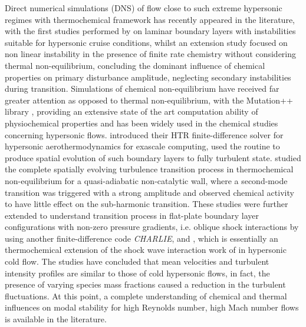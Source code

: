 
Direct numerical simulations (DNS) of flow close to such extreme hypersonic regimes with thermochemical framework has recently appeared in the literature, with the first studies performed by \cite{marxen2013} on laminar boundary layers with instabilities suitable for hypersonic cruise conditions, whilst an extension study \citep{marxen_iaccarino_magin_2014} focused on non linear instability in the presence of finite rate chemistry without considering thermal non-equilibrium, concluding the dominant influence of chemical properties on primary disturbance amplitude, neglecting secondary instabilities during transition. Simulations of chemical non-equilibrium have received far greater attention as opposed to thermal non-equilibrium, with the Mutation++ library \cite{Scoggins2020}, providing an extensive state of the art computation ability of physiochemical properties and has been widely used in the chemical studies concerning hypersonic flows. \cite{DiRenzo2020} introduced their HTR finite-difference solver for hypersonic aerothermodynamics for exascale computing, \cite{direnzo_urzay_2021} used the routine to produce spatial evolution of such boundary layers to fully turbulent state. \cite{Passiatore2021} studied the complete spatially evolving turbulence transition process in thermochemical non-equilibrium for a quasi-adiabatic non-catalytic wall, where a second-mode transition was triggered with a strong amplitude and observed chemical activity to have little effect on the sub-harmonic transition. These studies were further extended to understand transition process in flat-plate boundary layer configurations with non-zero pressure gradients, i.e. oblique shock interactions by \citep{Volpiani_2021} using another finite-difference code \textit{CHARLIE}, and \cite{passiatore2023}, which is essentially an thermochemical extension of the shock wave interaction work of \cite{sandham2014} in hypersonic cold flow. The studies have concluded that mean velocities and turbulent intensity profiles are similar to those of cold hypersonic flows, in fact, the presence of varying species mass fractions caused a reduction in the turbulent fluctuations. At this point,  a complete understanding of chemical and thermal influences on modal stability for high Reynolds number, high Mach number flows is available in the literature. 


